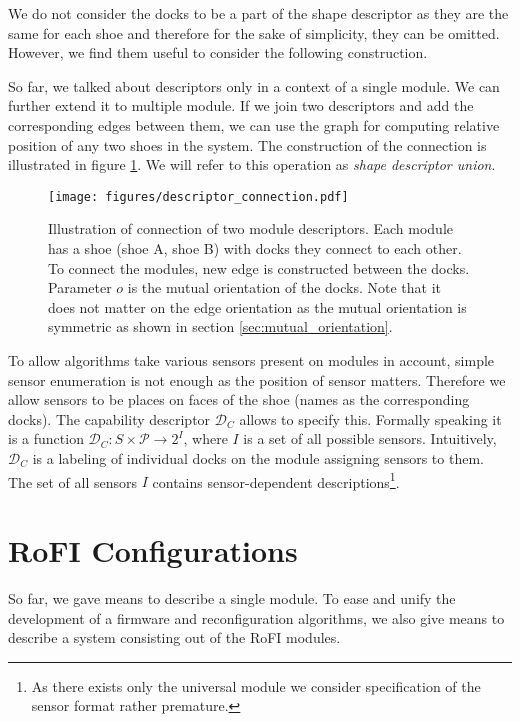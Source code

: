 We do not consider the docks to be a part of the shape descriptor as they are
the same for each shoe and therefore for the sake of simplicity, they can be
omitted. However, we find them useful to consider the following construction.

So far, we talked about descriptors only in a context of a single module. We can
further extend it to multiple module. If we join two descriptors and add the
corresponding edges between them, we can use the graph for computing relative
position of any two shoes in the system. The construction of the connection is
illustrated in figure \ref{fig:connection_descriptor}. We will refer to this
operation as \emph{shape descriptor union}.

\begin{figure}[h!]
    \centering
    \texttt{[image: figures/descriptor\_connection.pdf]}
    \caption{Illustration of connection of two module descriptors. Each module
    has a shoe (shoe A, shoe B) with docks they connect to each other. To
    connect the modules, new edge is constructed between the docks. Parameter
    $o$ is the mutual orientation of the docks. Note that it does not matter on
    the edge orientation as the mutual orientation is symmetric as shown in
    section \ref{sec:mutual_orientation}. }
    \label{fig:connection_descriptor}
\end{figure}


To allow algorithms take various sensors present on modules in account, simple
sensor enumeration is not enough as the position of sensor matters. Therefore we
allow sensors to be places on faces of the shoe (names as the corresponding
docks). The capability descriptor $\mathcal{D}_C$ allows to specify this.
Formally speaking it is a function $\mathcal{D}_C: S\times\mathcal{P}
\rightarrow 2^{I}$, where $I$ is a set of all possible sensors. Intuitively,
$\mathcal{D}_C$ is a labeling of individual docks on the module assigning
sensors to them. The set of all sensors $I$ contains sensor-dependent
descriptions\footnote{As there exists only the universal module we consider
specification of the sensor format rather premature.}.

\section{RoFI Configurations} \label{sec:configuration}

So far, we gave means to describe a single module. To ease and unify the
development of a firmware and reconfiguration algorithms, we also give means to
describe a system consisting out of the RoFI modules.


